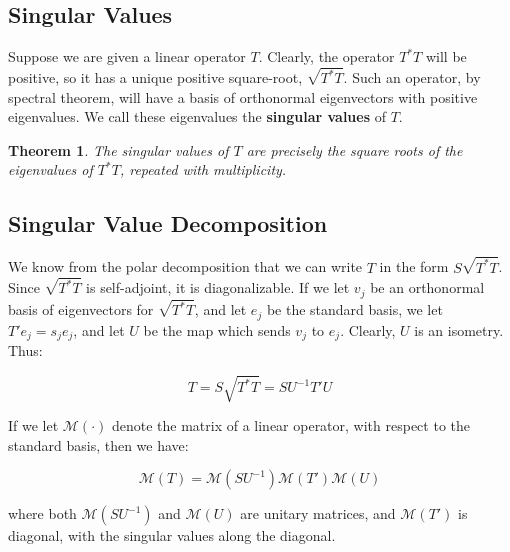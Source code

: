 \documentclass[
 10pt,
 amsmath,amssymb,
 notitlepage,
]{revtex4-1}
\newtheorem{thm}{Theorem}
\begin{document}
\subsection{Singular Values}

Suppose we are given a linear operator $T$. Clearly, the operator $T^{*} T$ will be positive, so it has a unique positive square-root, $\sqrt{T^{*} T}$. Such an operator, by spectral theorem,
will have a basis of orthonormal eigenvectors with positive eigenvalues. We call these eigenvalues the \textbf{singular values} of $T$.
\newline

\begin{thm}
  The singular values of $T$ are precisely the square roots of the eigenvalues of $T^{*} T$, repeated with multiplicity.
\end{thm}

\subsection{Singular Value Decomposition}

We know from the polar decomposition that we can write $T$ in the form $S \sqrt{T^{*} T}$. Since $\sqrt{T^{*} T}$ is self-adjoint, it is diagonalizable. If we let $v_j$ be an orthonormal
basis of eigenvectors for $\sqrt{T^{*} T}$, and let $e_j$ be the standard basis, we let $T' e_j = s_j e_j$, and let $U$ be the map which sends $v_j$ to $e_j$. Clearly, $U$ is an isometry. Thus:

$$T = S \sqrt{T^{*} T} = S U^{-1} T' U$$

If we let $\mathcal{M}(\cdot)$ denote the matrix of a linear operator, with respect to the standard basis, then we have:

$$\mathcal{M}(T) = \mathcal{M}(S U^{-1}) \mathcal{M}(T') \mathcal{M}(U)$$

where both $\mathcal{M}(S U^{-1})$ and $\mathcal{M}(U)$ are unitary matrices, and $\mathcal{M}(T')$ is diagonal, with the singular values along the diagonal.
\end{document}
